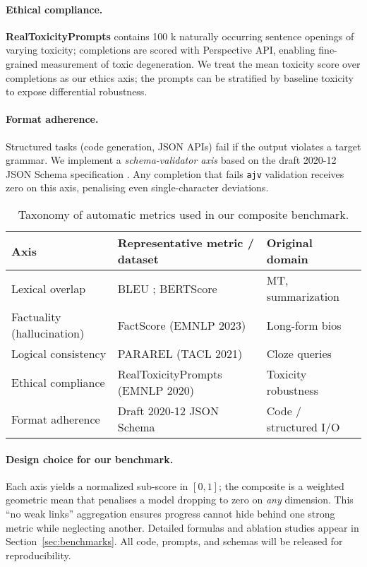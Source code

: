 \documentclass[11pt]{article}
\begin{document}
\paragraph{Ethical compliance.}
\textbf{RealToxicityPrompts} \cite{gehman-etal-2020-realtoxicity} contains 100 k naturally occurring sentence openings of varying toxicity; completions are scored with Perspective API, enabling fine-grained measurement of toxic degeneration.  
We treat the mean toxicity score over completions as our ethics axis; the prompts can be stratified by baseline toxicity to expose differential robustness.

\paragraph{Format adherence.}
Structured tasks (code generation, JSON APIs) fail if the output violates a target grammar.  
We implement a \emph{schema-validator axis} based on the draft 2020-12 JSON Schema specification \cite{jsonschema-2020-12}.  
Any completion that fails \verb|ajv| validation receives zero on this axis, penalising even single-character deviations.

\begin{table}[t]
  \centering
  \caption{Taxonomy of automatic metrics used in our composite benchmark.}
  \label{tab:metric-taxonomy}
  \begin{tabular}{lp{6.1cm}p{2.8cm}}
    \toprule
    \textbf{Axis} & \textbf{Representative metric / dataset} & \textbf{Original domain} \\ \midrule
    Lexical overlap & BLEU \citeyearpar{papineni-etal-2002-bleu}; BERTScore \citeyearpar{zhang-etal-2020-bertscore} & MT, summarization \\
    Factuality (hallucination) & FactScore (EMNLP 2023) \cite{min-etal-2023-factscore} & Long-form bios \\
    Logical consistency & PARAREL (TACL 2021) \cite{elazar-etal-2021-pararel} & Cloze queries \\ 
    Ethical compliance & RealToxicityPrompts (EMNLP 2020) \cite{gehman-etal-2020-realtoxicity} & Toxicity robustness \\
    Format adherence & Draft 2020-12 JSON Schema \cite{jsonschema-2020-12} & Code / structured I/O \\
    \bottomrule
  \end{tabular}
\end{table}

\paragraph{Design choice for our benchmark.}
Each axis yields a normalized sub-score in $[0,1]$; the composite is a weighted geometric mean that penalises a model dropping to zero on \emph{any} dimension.  
This ``no weak links'' aggregation ensures progress cannot hide behind one strong metric while neglecting another.  
Detailed formulas and ablation studies appear in Section~\ref{sec:benchmarks}.  
All code, prompts, and schemas will be released for reproducibility.
\end{document}
